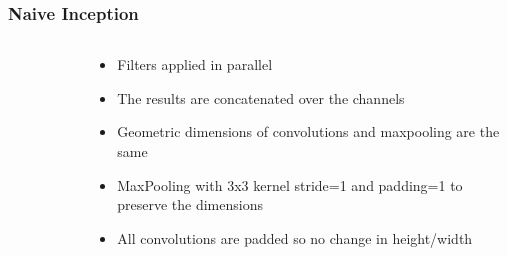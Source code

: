 \documentclass{beamer}
\begin{document}
\begin{frame}
	\frametitle{Naive Inception}
\begin{columns}
	\begin{column}{0.5\textwidth}

	\begin{figure}
    \end{figure}
\end{column}
\begin{column}{0.5\textwidth}
	\begin{itemize}
		\item Filters applied in parallel
		\item The results are concatenated over the channels
		\item Geometric dimensions of convolutions and maxpooling are the same 
		\item MaxPooling with 3x3 kernel stride=1 and padding=1 to preserve the dimensions
		\item All convolutions are padded so no change in height/width
	\end{itemize}
\end{column}
\end{columns}

\end{frame}
\end{document}
